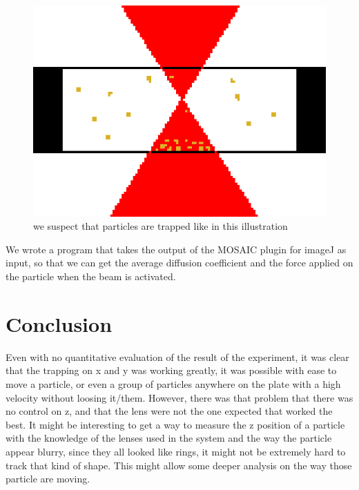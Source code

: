 \documentclass[a4paper,12pt,twoside]{article}	%
\begin{document}
\begin{figure}
	\begin{center}
	\includegraphics[width=0.7\linewidth,angle=0]{./figures/trap_illustration}
	\caption{we suspect that particles are trapped like in this illustration} \label{fig:gros_trap}
	\end{center}
\end{figure}

We wrote a program that takes the output of the MOSAIC plugin for imageJ as input, so that we can get the average diffusion coefficient and the force applied on the particle when the beam is activated.







\section{Conclusion}

Even with no quantitative evaluation of the result of the experiment, it was clear that the trapping on x and y was working greatly, it was possible with ease to move a particle, or even a group of particles anywhere on the plate with a high velocity without loosing it/them. However, there was that problem that there was no control on z, and that the lens were not the one expected that worked the best. It might be interesting to get a way to measure the z position of a particle with the knowledge of the lenses used in the system and the way the particle appear blurry, since they all looked like rings, it might not be extremely hard to track that kind of shape. This might allow some deeper analysis on the way those particle are moving.
\end{document}
